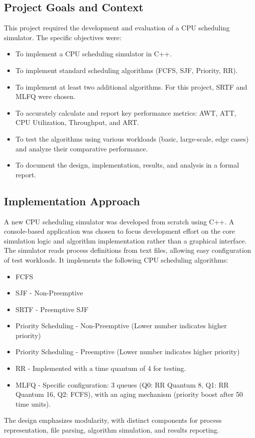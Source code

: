 \documentclass[12pt]{article}
\begin{document}
\subsection{Project Goals and Context}
This project required the development and evaluation of a CPU scheduling simulator. The specific objectives were:
\begin{itemize}
    \item To implement a CPU scheduling simulator in C++.
    \item To implement standard scheduling algorithms (FCFS, SJF, Priority, RR).
    \item To implement at least two additional algorithms. For this project, SRTF and MLFQ were chosen.
    \item To accurately calculate and report key performance metrics: AWT, ATT, CPU Utilization, Throughput, and ART.
    \item To test the algorithms using various workloads (basic, large-scale, edge cases) and analyze their comparative performance.
    \item To document the design, implementation, results, and analysis in a formal report.
\end{itemize}

\subsection{Implementation Approach}
A new CPU scheduling simulator was developed from scratch using C++. A console-based application was chosen to focus development effort on the core simulation logic and algorithm implementation rather than a graphical interface. The simulator reads process definitions from text files, allowing easy configuration of test workloads. It implements the following CPU scheduling algorithms:
\begin{itemize}
    \item FCFS
    \item SJF - Non-Preemptive
    \item SRTF - Preemptive SJF
    \item Priority Scheduling - Non-Preemptive (Lower number indicates higher priority)
    \item Priority Scheduling - Preemptive (Lower number indicates higher priority)
    \item RR - Implemented with a time quantum of 4 for testing.
    \item MLFQ - Specific configuration: 3 queues (Q0: RR Quantum 8, Q1: RR Quantum 16, Q2: FCFS), with an aging mechanism (priority boost after 50 time units).
\end{itemize}
The design emphasizes modularity, with distinct components for process representation, file parsing, algorithm simulation, and results reporting.
\end{document}
